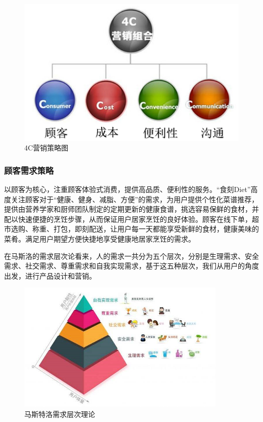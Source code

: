 \documentclass[UTF8,12pt]{ctexart}
\numberwithin{figure}{section}%
\begin{document}
\begin{spacing}{2}
\begin{figure}[!htb]
	\centering
	\includegraphics[width=12cm]{fig/24}
	\caption{4C营销策略图}
\end{figure}


\subsubsection{顾客需求策略}

以顾客为核心，注重顾客体验式消费，提供高品质、便利性的服务。“食刻Diet”高度关注顾客对于“健康、健身、减脂、方便”的需求，为用户提供个性化菜谱推荐，提供由营养学家和厨师团队制定的定期更新的健康食谱，挑选容易保鲜的食材，并配以快速便捷的烹饪步骤，从而保证用户居家烹饪的良好体验。顾客在线下单，超市选购、称重、打包，即刻配送，让用户每一天都能享受新鲜的食材，健康美味的菜肴。满足用户期望方便快捷地享受健康地居家烹饪的需求。

在马斯洛的需求层次论看来，人的需求一共分为五个层次，分别是生理需求、安全需求、社交需求、尊重需求和自我实现需求，基于这五种层次，我们从用户的角度出发，进行产品设计和营销。

\begin{figure}[!htb]
	\centering
	\includegraphics[width=10cm]{fig/23}
	\caption{马斯特洛需求层次理论}
\end{figure}


\end{spacing}
\end{document}
